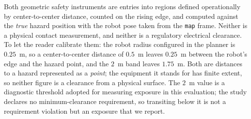 Both geometric safety instruments are entries into regions defined operationally by
center-to-center distance, counted on the rising edge, and computed against the
\emph{true} hazard position with the robot pose taken from the \texttt{map} frame.
Neither is a physical contact measurement, and neither is a regulatory electrical
clearance. To let the reader calibrate them: the robot radius configured in the
planner is $0.25$~m, so a center-to-center distance of $0.5$~m leaves $0.25$~m
between the robot's edge and the hazard point, and the $2$~m band leaves
$1.75$~m. Both are distances to a hazard represented as a \emph{point}; the
equipment it stands for has finite extent, so neither figure is a clearance from a
physical surface. The $2$~m value is a diagnostic threshold adopted for measuring
exposure in this evaluation; the study declares no minimum-clearance requirement, so
transiting below it is not a requirement violation but an exposure that we report.


